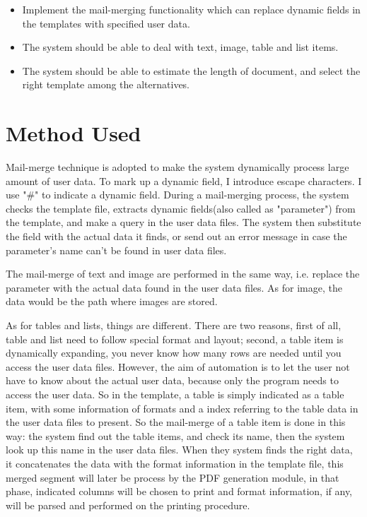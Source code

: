 \documentclass{report}
\begin{document}
\begin{itemize}
\item Implement the mail-merging functionality which can replace dynamic fields in the templates with specified user data.
\item The system should be able to deal with text, image, table and list items.
\item The system should be able to estimate the length of document, and select the right template among the alternatives.
\end{itemize}

\section{Method Used}
  Mail-merge technique is adopted to make the system dynamically process large amount of user data. To mark up a dynamic field, I introduce escape characters. I use "\#" to indicate a dynamic field. During a mail-merging process, the system checks the template file, extracts dynamic fields(also called as "parameter") from the template, and make a query in the user data files. The system then substitute the field with the actual data it finds, or send out an error message in case the parameter's name can't be found in user data files. 

  The mail-merge of text and image are performed in the same way, i.e. replace the parameter with the actual data found in the user data files. As for image, the data would be the path where images are stored.

  As for tables and lists, things are different. There are two reasons, first of all, table and list need to follow special format and layout; second, a table item is dynamically expanding, you never know how many rows are needed until you access the user data files. However, the aim of automation is to let the user not have to know about the actual user data, because only the program needs to access the user data. So in the template, a table is simply indicated as a table item, with some information of formats and a index referring to the table data in the user data files to present. So the mail-merge of a table item is done in this way: the system find out the table items, and check its name, then the system look up this name in the user data files. When they system finds the right data, it concatenates the data with the format information in the template file, this merged segment will later be process by the PDF generation module, in that phase, indicated columns will be chosen to print and format information, if any, will be parsed and performed on the printing procedure.
\end{document}

